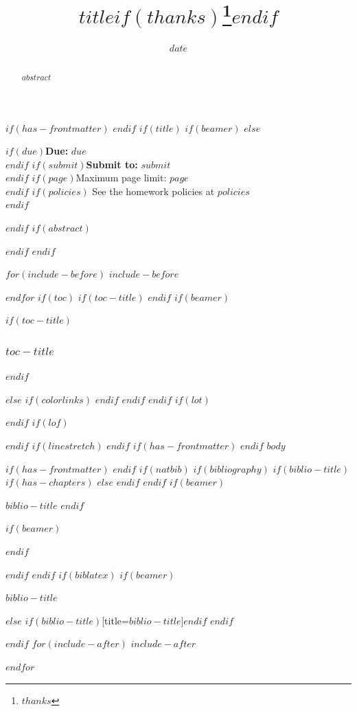 \documentclass[
$if(fontsize)$
  $fontsize$,
$endif$
$if(lang)$
  $babel-lang$,
$endif$
$if(papersize)$
  $papersize$paper,
$endif$
$if(beamer)$
  ignorenonframetext,
$if(handout)$
  handout,
$endif$
$if(aspectratio)$
  aspectratio=$aspectratio$,
$endif$
$endif$
$for(classoption)$
  $classoption$$sep$,
$endfor$
]{$documentclass$}
\title{\textsc{\Large{$title$$if(thanks)$\thanks{$thanks$}$endif$}}\vspace{-2ex}}
\author{\textsc{\Large{$for(author)$$author$$sep$ \and $endfor$}}}
\date{$date$}
\institute{$for(institute)$$institute$$sep$ \and $endfor$}
\newif\ifbibliography
\begin{document}
$if(has-frontmatter)$
\frontmatter
$endif$
$if(title)$
$if(beamer)$
\frame{\titlepage}
$else$
\maketitle
\vspace{-0.75cm}
\begin{center}
$if(due)$\normalsize{\textbf{Due:} \textit{$due$}} \\$endif$
$if(submit)$\normalsize{\textbf{Submit to:} \textit{$submit$}} \\$endif$
$if(page)$\normalsize{Maximum page limit: $page$} \\$endif$
$if(policies)$\vspace{0.15cm}
\normalsize{See the homework policies at $policies$} \\$endif$
\vspace{0.25cm}
\end{center}

$endif$
$if(abstract)$
\begin{abstract}
$abstract$
\end{abstract}
$endif$
$endif$

$for(include-before)$
$include-before$

$endfor$
$if(toc)$
$if(toc-title)$
\renewcommand*\contentsname{$toc-title$}
$endif$
$if(beamer)$
\begin{frame}[allowframebreaks]
$if(toc-title)$
  \frametitle{$toc-title$}
$endif$
  \tableofcontents[hideallsubsections]
\end{frame}
$else$
{
$if(colorlinks)$
\hypersetup{linkcolor=$if(toccolor)$$toccolor$$else$$endif$}
$endif$
\setcounter{tocdepth}{$toc-depth$}
\tableofcontents
}
$endif$
$endif$
$if(lot)$
\listoftables
$endif$
$if(lof)$
\listoffigures
$endif$
$if(linestretch)$
$endif$
$if(has-frontmatter)$
\mainmatter
$endif$
$body$

$if(has-frontmatter)$
\backmatter
$endif$
$if(natbib)$
$if(bibliography)$
$if(biblio-title)$
$if(has-chapters)$
\renewcommand\bibname{$biblio-title$}
$else$
\renewcommand\refname{$biblio-title$}
$endif$
$endif$
$if(beamer)$
\begin{frame}[allowframebreaks]{$biblio-title$}
  \bibliographytrue
$endif$
  
$if(beamer)$
\end{frame}
$endif$

$endif$
$endif$
$if(biblatex)$
$if(beamer)$
\begin{frame}[allowframebreaks]{$biblio-title$}
  \bibliographytrue
  \printbibliography[heading=none]
\end{frame}
$else$
\printbibliography$if(biblio-title)$[title=$biblio-title$]$endif$
$endif$

$endif$
$for(include-after)$
$include-after$

$endfor$
\end{document}
